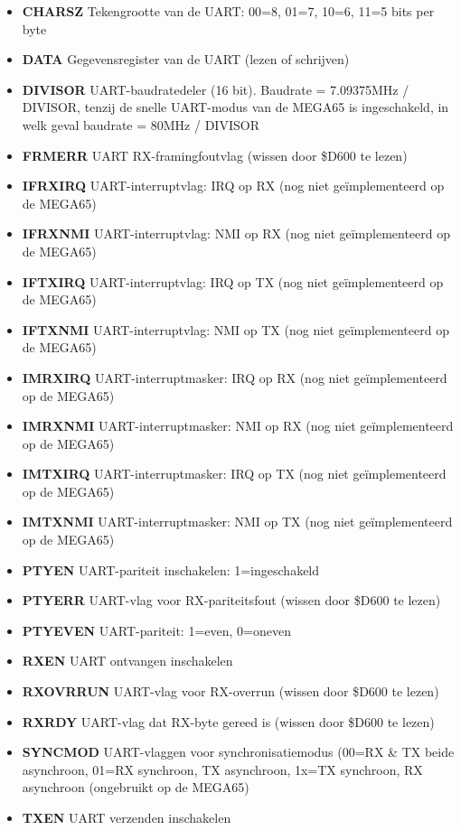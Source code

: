 \begin{itemize}
\item{\bf{CHARSZ}} Tekengrootte van de UART: 00=8, 01=7, 10=6, 11=5 bits per byte
\item{\bf{DATA}} Gegevensregister van de UART (lezen of schrijven)
\item{\bf{DIVISOR}} UART-baudratedeler (16 bit). Baudrate = 7.09375MHz / DIVISOR, tenzij de snelle UART-modus van de MEGA65 is ingeschakeld, in welk geval baudrate = 80MHz / DIVISOR
\item{\bf{FRMERR}} UART RX-framingfoutvlag (wissen door \$D600 te lezen)
\item{\bf{IFRXIRQ}} UART-interruptvlag: IRQ op RX (nog niet geïmplementeerd op de MEGA65)
\item{\bf{IFRXNMI}} UART-interruptvlag: NMI op RX (nog niet geïmplementeerd op de MEGA65)
\item{\bf{IFTXIRQ}} UART-interruptvlag: IRQ op TX (nog niet geïmplementeerd op de MEGA65)
\item{\bf{IFTXNMI}} UART-interruptvlag: NMI op TX (nog niet geïmplementeerd op de MEGA65)
\item{\bf{IMRXIRQ}} UART-interruptmasker: IRQ op RX (nog niet geïmplementeerd op de MEGA65)
\item{\bf{IMRXNMI}} UART-interruptmasker: NMI op RX (nog niet geïmplementeerd op de MEGA65)
\item{\bf{IMTXIRQ}} UART-interruptmasker: IRQ op TX (nog niet geïmplementeerd op de MEGA65)
\item{\bf{IMTXNMI}} UART-interruptmasker: NMI op TX (nog niet geïmplementeerd op de MEGA65)
\item{\bf{PTYEN}} UART-pariteit inschakelen: 1=ingeschakeld
\item{\bf{PTYERR}} UART-vlag voor RX-pariteitsfout (wissen door \$D600 te lezen)
\item{\bf{PTYEVEN}} UART-pariteit: 1=even, 0=oneven
\item{\bf{RXEN}} UART ontvangen inschakelen
\item{\bf{RXOVRRUN}} UART-vlag voor RX-overrun (wissen door \$D600 te lezen)
\item{\bf{RXRDY}} UART-vlag dat RX-byte gereed is (wissen door \$D600 te lezen)
\item{\bf{SYNCMOD}} UART-vlaggen voor synchronisatiemodus (00=RX \& TX beide asynchroon, 01=RX synchroon, TX asynchroon, 1x=TX synchroon, RX asynchroon (ongebruikt op de MEGA65)
\item{\bf{TXEN}} UART verzenden inschakelen
\end{itemize}
